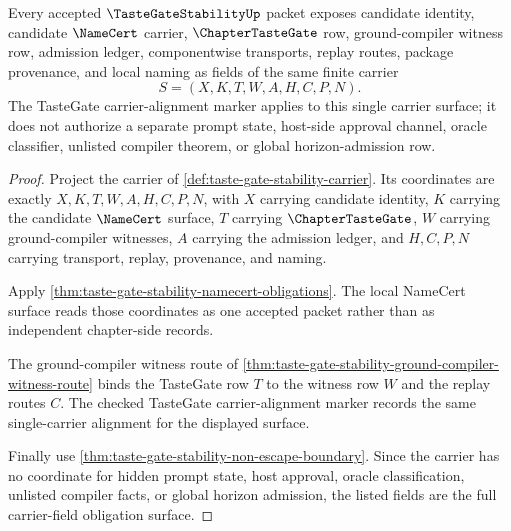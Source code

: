 \begin{theorem}
\label{thm:taste-gate-stability-carrier-field-obligation}
Every accepted $\TasteGateStabilityUp$ packet exposes candidate identity, candidate $\NameCert$ carrier, $\ChapterTasteGate$ row, ground-compiler witness row, admission ledger, componentwise transports, replay routes, package provenance, and local naming as fields of the same finite carrier
$$
S=(X,K,T,W,A,H,C,P,N).
$$
The TasteGate carrier-alignment marker applies to this single carrier surface; it does not authorize a separate prompt state, host-side approval channel, oracle classifier, unlisted compiler theorem, or global horizon-admission row.
\end{theorem}
\begin{proof}
Project the carrier of \autoref{def:taste-gate-stability-carrier}. Its coordinates are exactly $X,K,T,W,A,H,C,P,N$, with $X$ carrying candidate identity, $K$ carrying the candidate $\NameCert$ surface, $T$ carrying $\ChapterTasteGate$, $W$ carrying ground-compiler witnesses, $A$ carrying the admission ledger, and $H,C,P,N$ carrying transport, replay, provenance, and naming.

Apply \autoref{thm:taste-gate-stability-namecert-obligations}. The local NameCert surface reads those coordinates as one accepted packet rather than as independent chapter-side records.

The ground-compiler witness route of \autoref{thm:taste-gate-stability-ground-compiler-witness-route} binds the TasteGate row $T$ to the witness row $W$ and the replay routes $C$. The checked TasteGate carrier-alignment marker records the same single-carrier alignment for the displayed surface.

Finally use \autoref{thm:taste-gate-stability-non-escape-boundary}. Since the carrier has no coordinate for hidden prompt state, host approval, oracle classification, unlisted compiler facts, or global horizon admission, the listed fields are the full carrier-field obligation surface.
\end{proof}

